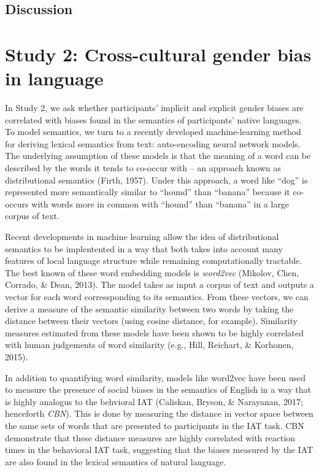 \documentclass[10pt, letterpaper]{article}
\begin{document}
\subsection{Discussion}\label{discussion}

\section{Study 2: Cross-cultural gender bias in
language}\label{study-2-cross-cultural-gender-bias-in-language}

In Study 2, we ask whether participants' implicit and explicit gender
biases are correlated with biases found in the semantics of
participants' native languages. To model semantics, we turn to a
recently developed machine-learning method for deriving lexical
semantics from text: auto-encoding neural network models. The underlying
assumption of these models is that the meaning of a word can be
described by the words it tends to co-occur with -- an approach known as
distributional semantics (Firth, 1957). Under this approach, a word like
``dog'' is represented more semantically similar to ``hound'' than
``banana'' because it co-occurs with words more in common with ``hound''
than ``banana'' in a large corpus of text.

Recent developments in machine learning allow the idea of distributional
semantics to be implentented in a way that both takes into account many
features of local language structure while remaining computationally
tractable. The best known of these word embedding models is
\emph{word2vec} (Mikolov, Chen, Corrado, \& Dean, 2013). The model takes
as input a corpus of text and outputs a vector for each word
corressponding to its semantics. From these vectors, we can derive a
measure of the semantic similarity between two words by taking the
distance between their vectors (using cosine distance, for example).
Similarity measures estimated from these models have been shown to be
highly correlated with human judgements of word similarity (e.g., Hill,
Reichart, \& Korhonen, 2015).

In addition to quantifying word similarity, models like word2vec have
been used to measure the presence of social biases in the semantics of
English in a way that is highly analogus to the behvioral IAT (Caliskan,
Bryson, \& Narayanan, 2017; henceforth \emph{CBN}). This is done by
measuring the distance in vector space between the same sets of words
that are presented to participants in the IAT task. CBN demonstrate that
these distance measures are highly correlated with reaction times in the
behavioral IAT task, suggesting that the biases measured by the IAT are
also found in the lexical semantics of natural language.
\end{document}
